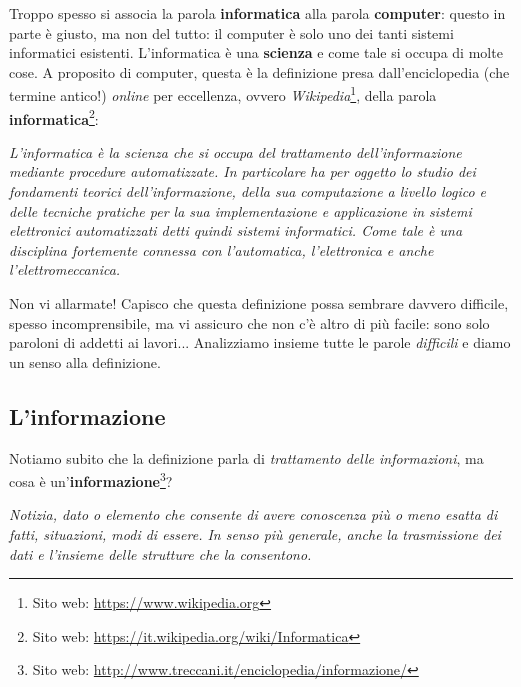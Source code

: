\documentclass[11pt,fleqn,a5paper]{book} %
\begin{document}
    		Troppo spesso si associa la parola \textbf{informatica} alla parola \textbf{computer}: questo in parte è giusto, ma non del tutto: il computer è solo uno dei tanti sistemi informatici esistenti. L'informatica è una \textbf{scienza} e come tale si occupa di molte cose.
    		A proposito di computer, questa è la definizione presa dall'enciclopedia (che termine antico!) \textit{online} per eccellenza, ovvero \textit{Wikipedia}\footnote{Sito web: \url{https://www.wikipedia.org}}, della parola \textbf{informatica}\footnote{Sito web: \url{https://it.wikipedia.org/wiki/Informatica}}:\\
    		
    		\begin{definition}[Informatica]\label{def: Informatica}
    			\textit{L'informatica è la scienza che si occupa del trattamento dell'informazione mediante procedure automatizzate. In particolare ha per oggetto lo studio dei fondamenti teorici dell'informazione, della sua computazione a livello logico e delle tecniche pratiche per la sua implementazione e applicazione in sistemi elettronici automatizzati detti quindi sistemi informatici. Come tale è una disciplina fortemente connessa con l'automatica, l'elettronica e anche l'elettromeccanica.}
    		\end{definition}
    	
    		Non vi allarmate! Capisco che questa definizione possa sembrare davvero difficile, spesso incomprensibile, ma vi assicuro che non c'è altro di più facile: sono solo paroloni di addetti ai lavori... Analizziamo insieme tutte le parole \textit{difficili} e diamo un senso alla definizione.
    	
    		\subsection{L'informazione}
    		\label{sub: L'informazione}
    			Notiamo subito che la definizione parla di \textit{trattamento delle informazioni}, ma cosa è un'\textbf{informazione}\footnote{Sito web: \url{http://www.treccani.it/enciclopedia/informazione/}}?
    			\begin{definition}[Informazione]\label{def: Informazione}
    				\textit{Notizia, dato o elemento che consente di avere conoscenza più o meno esatta di fatti, situazioni, modi di essere. In senso più generale, anche la trasmissione dei dati e l’insieme delle strutture che la consentono.}
    			\end{definition}
    		
\end{document}
